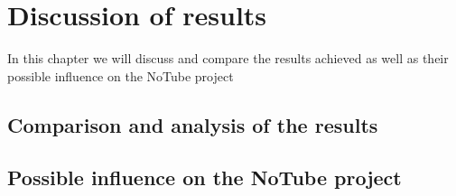 \section{Discussion of results}
In this chapter we will discuss and compare the results achieved as well as their possible influence on the NoTube project

\subsection{Comparison and analysis of the results}

\subsection{Possible influence on the NoTube project}
